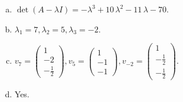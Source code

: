 \begin{questions}
\begin{solution}
\begin{enumerate}[(a)]
\item $\det(A-\lambda I)=-{\lambda}^{3} + 10 \, {\lambda}^{2} - 11 \, {\lambda} - 70$.
\item ${\lambda}_1=7, {\lambda}_2=5, {\lambda}_3=-2$.
\item $v_{7}=\left(\begin{array}{r}
1 \\
-2 \\
-\frac{1}{2}
\end{array}\right), v_{5}=\left(\begin{array}{r}
1 \\
-1 \\
-1
\end{array}\right), v_{-2}=\left(\begin{array}{r}
1 \\
-\frac{1}{2} \\
-\frac{1}{2}
\end{array}\right)$.
\item Yes.
\end{enumerate}
\end{solution}

\end{questions}

\newpage


\begin{center}
\end{center}

